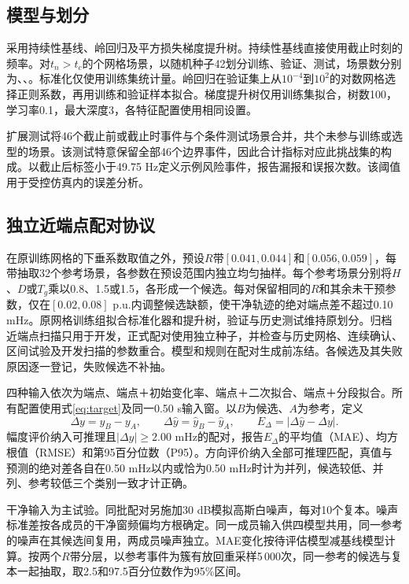 \documentclass[UTF8,a4paper,11pt]{ctexart}
\begin{document}
\subsection{模型与划分}
采用持续性基线、岭回归\cite{ridge}及平方损失梯度提升树\cite{friedman}。持续性基线直接使用截止时刻的频率。对$t_n>t_c$的\GridAfter{}个网格场景，以随机种子42划分训练、验证、测试，场景数分别为\TrainN{}、\ValidationN{}、\TestN{}。标准化仅使用训练集统计量。岭回归在验证集上从$10^{-4}$到$10^2$的对数网格选择正则系数，再用训练和验证样本拟合。梯度提升树仅用训练集拟合，树数100，学习率0.1，最大深度3，各特征配置使用相同设置。

扩展测试将46个截止前或截止时事件与\TestN{}个条件测试场景合并，共\FullN{}个未参与训练或选型的场景。该测试特意保留全部46个边界事件，因此合计指标对应此挑战集的构成。以截止后标签小于49.75 Hz定义示例风险事件，报告漏报和误报次数。该阈值用于受控仿真内的误差分析。

\subsection{独立近端点配对协议}
\label{sec:pair-design}
在原训练网格的下垂系数取值之外，预设$R$带$[0.041,0.044]$和$[0.056,0.059]$，每带抽取32个参考场景，各参数在预设范围内独立均匀抽样。每个参考场景分别将$H$、$D$或$T_g$乘以0.8、1.5或1.5，各形成一个候选。每对保留相同的$R$和其余未干预参数，仅在$[0.02,0.08]$ p.u.内调整候选缺额，使干净轨迹的绝对端点差不超过0.10 mHz。原网格训练组拟合标准化器和提升树，验证与历史测试维持原划分。归档近端点扫描只用于开发，正式配对使用独立种子，并检查与历史网格、连续确认、区间试验及开发扫描的参数重合。模型和规则在配对生成前冻结。各候选及其失败原因逐一登记，失败候选不补抽。

四种输入依次为端点、端点＋初始变化率、端点＋二次拟合、端点＋分段拟合。所有配置使用式\eqref{eq:target}及同一0.50 s输入窗。以$B$为候选、$A$为参考，定义
\begin{equation}
\Delta y=y_B-y_A,\qquad \Delta\hat y=\hat y_B-\hat y_A,\qquad
E_\Delta=|\Delta\hat y-\Delta y|.
\label{eq:pair-loss}
\end{equation}
幅度评价纳入可推理且$|\Delta y|\ge 2.00$ mHz的配对，报告$E_\Delta$的平均值（MAE）、均方根值（RMSE）和第95百分位数（P95）。方向评价纳入全部可推理匹配，真值与预测的绝对差各自在0.50 mHz以内或恰为0.50 mHz时计为并列，候选较低、并列、参考较低三个类别一致才计正确。

干净输入为主试验。同批配对另施加30 dB模拟高斯白噪声，每对10个复本。噪声标准差按各成员的干净窗频偏均方根确定。同一成员输入供四模型共用，同一参考的噪声在其候选间复用，两成员噪声独立。MAE变化按待评估模型减基线模型计算。按两个$R$带分层，以参考事件为簇有放回重采样5\,000次，同一参考的候选与复本一起抽取，取2.5和97.5百分位数作为95\%区间。
\end{document}
